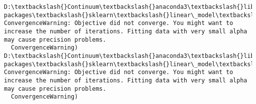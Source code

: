 \documentclass[11pt]{article}
\begin{document}
    \begin{Verbatim}[commandchars=\\\{\}]
D:\textbackslash{}Continuum\textbackslash{}anaconda3\textbackslash{}lib\textbackslash{}site-packages\textbackslash{}sklearn\textbackslash{}linear\_model\textbackslash{}coordinate\_descent.py:491: ConvergenceWarning: Objective did not converge. You might want to increase the number of iterations. Fitting data with very small alpha may cause precision problems.
  ConvergenceWarning)
D:\textbackslash{}Continuum\textbackslash{}anaconda3\textbackslash{}lib\textbackslash{}site-packages\textbackslash{}sklearn\textbackslash{}linear\_model\textbackslash{}coordinate\_descent.py:491: ConvergenceWarning: Objective did not converge. You might want to increase the number of iterations. Fitting data with very small alpha may cause precision problems.
  ConvergenceWarning)

    \end{Verbatim}

    \begin{center}
    \end{center}
    { \hspace*{\fill} \\}
    
    \begin{center}
    \end{center}
    { \hspace*{\fill} \\}
    
    \begin{center}
    \end{center}
    { \hspace*{\fill} \\}
    
    \begin{center}
    \end{center}
    { \hspace*{\fill} \\}
    
    \begin{center}
    \end{center}
    { \hspace*{\fill} \\}
    
\end{document}
